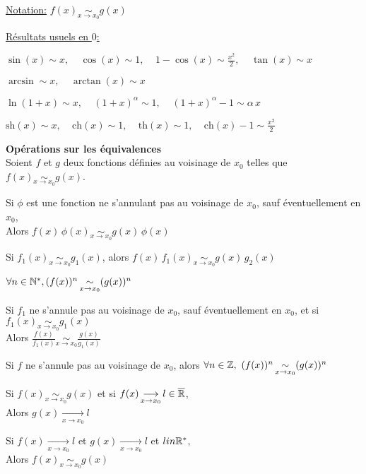 \documentclass[12pt,twoside,a4paper]{article}
\begin{document}
	\begin{flushleft}
		\underline{Notation:} $f(x)\mathop{\sim}\limits_{x\rightarrow x_0}g(x)$
	\end{flushleft}
	\newpage
	\begin{flushleft}
		\underline{R\'esultats usuels en $0$:}
		\begin{liste}
			\item $\sin(x)\sim x,\ \ \ \ \ \cos(x)\sim 1,\ \ \ \ \  1-\cos(x)\sim \frac{x^2}2,\ \ \ \ \  \tan(x)\sim x$
			\item $\arcsin \sim x,\ \ \ \ \ \arctan(x)\sim x$
			\item $\ln(1+x)\sim x,\ \ \ \ \ (1+x)^\alpha\sim 1,\ \ \ \ \ (1+x)^\alpha-1\sim\alpha\,x $
			\item $\text{sh}(x)\sim x,\ \ \ \ \ \text{ch}(x)\sim 1,\ \ \ \ \ \text{th}(x)\sim 1,\ \ \ \ \ \text{ch}(x)-1\sim \frac{x^2}2$
		\end{liste}
	\end{flushleft}
	\begin{prop}
		\textbf{Op\'erations sur les \'equivalences}\\
		Soient $f$ et $g$ deux fonctions d\'efinies au voisinage de $x_0$ telles que $f(x)\mathop{\sim}\limits_{x\rightarrow x_0}g(x)$.
		\begin{liste}
			\item Si $\phi$ est une fonction ne s'annulant pas au voisinage de $x_0$, sauf \'eventuellement en $x_0$,\\
				Alors $f(x)\,\phi(x)\mathop{\sim}\limits_{x\rightarrow x_0}g(x)\,\phi(x)$
			\item Si $f_1(x)\mathop{\sim}\limits_{x\rightarrow x_0}g_1(x)$, alors $f(x)\,f_1(x)\mathop{\sim}\limits_{x\rightarrow x_0}g(x)\,g_2(x)$
			\item $\forall n\in\mathbb{N}^{*},(f(x))^n\mathop{\sim}\limits_{x\rightarrow x_0}(g(x))^n$
			\item Si $f_1$ ne s'annule pas au voisinage de $x_0$, sauf \'eventuellement en $x_0$, et si $f_1(x)\mathop{\sim}\limits_{x\rightarrow x_0}g_1(x)$\\
				Alors $\frac{f(x)}{f_1(x)}\mathop{\sim}\limits_{x\rightarrow x_0}\frac{g(x)}{g_1(x)}$
			\item Si $f$ ne s'annule pas au voisinage de $x_0$, alors $\forall n\in\Z,\ (f(x))^n\mathop{\sim}\limits_{x\rightarrow x_0}(g(x))^n $
		\end{liste}
	\end{prop}
	\begin{prop}
		\begin{liste}
			\item Si $f(x)\mathop{\sim}\limits_{x\rightarrow x_0}g(x)$ et si $f(x)\mathop{\longrightarrow}\limits_{x\rightarrow x_0}l\in\overline{\mathbb{R}}$,\\
				Alors $g(x)\mathop{\longrightarrow}\limits_{x\rightarrow x_0}l$
			\item Si $f(x)\mathop{\longrightarrow}\limits_{x\rightarrow x_0}l$ et $g(x)\mathop{\longrightarrow}\limits_{x\rightarrow x_0}l$ et $lin\mathbb{R}^{*}$,\\
				Alors $f(x)\mathop{\sim}\limits_{x\rightarrow x_0}g(x)$ 
		\end{liste}
	\end{prop}
\end{document}
